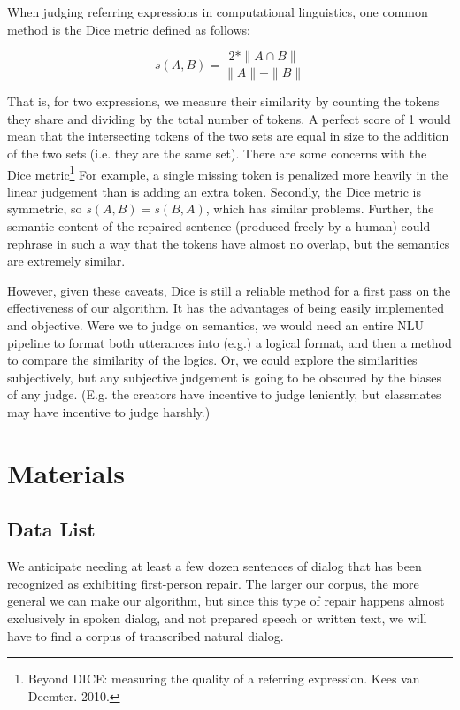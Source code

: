 \documentclass{article}
\begin{document}
\begin{flushleft}
 
  When judging referring expressions in computational linguistics, one common method is the Dice metric defined as follows:

  $$s(A,B)=\frac{2*\| A\cap B\|}{\| A\| +\| B\| }$$

  That is, for two expressions, we measure their similarity by counting the tokens they share and dividing by the total number of tokens. A perfect score of 1 would mean that the intersecting tokens of the two sets are equal in size to the addition of the two sets (i.e. they are the same set). There are some concerns with the Dice metric\footnote{Beyond DICE: measuring the quality of a referring expression. Kees van Deemter. 2010.} For example, a single missing token is penalized more heavily in the linear judgement than is adding an extra token. Secondly, the Dice metric is symmetric, so $s(A, B) = s(B, A)$, which has similar problems. Further, the semantic content of the repaired sentence (produced freely by a human) could rephrase in such a way that the tokens have almost no overlap, but the semantics are extremely similar.

  However, given these caveats, Dice is still a reliable method for a first pass on the effectiveness of our algorithm. It has the advantages of being easily implemented and objective. Were we to judge on semantics, we would need an entire NLU pipeline to format both utterances into (e.g.) a logical format, and then a method to compare the similarity of the logics. Or, we could explore the similarities subjectively, but any subjective judgement is going to be obscured by the biases of any judge. (E.g. the creators have incentive to judge leniently, but classmates may have incentive to judge harshly.)
  
\end{flushleft}

\section{Materials}
\subsection{Data List}

\begin{flushleft}

We anticipate needing at least a few dozen sentences of dialog that has been recognized as exhibiting first-person repair. The larger our corpus, the more general we can make our algorithm, but since this type of repair happens almost exclusively in spoken dialog, and not prepared speech or written text, we will have to find a corpus of transcribed natural dialog.

\end{flushleft}
\end{document}
